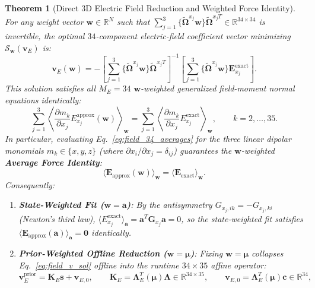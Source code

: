 \documentclass[11pt,a4paper]{article}
\newcommand{\bOmega}{\mathbf{\Omega}}
\newcommand{\bLambda}{\mathbf{\Lambda}}
\newtheorem{theorem}{Theorem}
\begin{document}
\begin{theorem}[Direct 3D Electric Field Reduction and Weighted Force Identity]
\label{thm:field_reduction}
For any weight vector $\bm{w} \in \mathbb{R}^N$ such that $\sum_{j=1}^3 \{\tilde{\bOmega}^{x_j} \bm{w}\} \tilde{\bOmega}^{x_j T} \in \mathbb{R}^{34 \times 34}$ is invertible, the optimal $34$-component electric-field coefficient vector minimizing $\mathcal{S}_{\bm{w}}(\bm{v}_E)$ is:
\begin{equation}
    \bm{v}_E(\bm{w}) = - \left[ \sum_{j=1}^3 \{\tilde{\bOmega}^{x_j} \bm{w}\} \tilde{\bOmega}^{x_j T} \right]^{-1} \left[ \sum_{j=1}^3 \{\tilde{\bOmega}^{x_j} \bm{w}\} \bm{E}_{x_j}^{\mathrm{exact}} \right].
    \label{eq:field_v_sol}
\end{equation}
This solution satisfies all $M_E = 34$ $\bm{w}$-weighted generalized field-moment normal equations identically:
\begin{equation}
    \sum_{j=1}^3 \left\langle \frac{\partial m_k}{\partial x_j} E_{x_j}^{\mathrm{approx}}(\bm{w}) \right\rangle_{\bm{w}} = \sum_{j=1}^3 \left\langle \frac{\partial m_k}{\partial x_j} E_{x_j}^{\mathrm{exact}} \right\rangle_{\bm{w}}, \qquad k = 2, \dots, 35.
    \label{eq:field_34_averages}
\end{equation}
In particular, evaluating Eq.~\eqref{eq:field_34_averages} for the three linear dipolar monomials $m_k \in \{x, y, z\}$ (where $\partial x_i / \partial x_j = \delta_{ij}$) guarantees the $\bm{w}$-weighted \textbf{Average Force Identity}:
\begin{equation}
    \langle \bm{E}_{\mathrm{approx}}(\bm{w}) \rangle_{\bm{w}} = \langle \bm{E}_{\mathrm{exact}} \rangle_{\bm{w}}.
    \label{eq:avg_force_preservation}
\end{equation}
Consequently:
\begin{enumerate}
    \item \textbf{State-Weighted Fit ($\bm{w} = \bm{a}$)}: By the antisymmetry $G_{x_j, ik} = -G_{x_j, ki}$ (Newton's third law), $\langle E_{x_j}^{\mathrm{exact}} \rangle_{\bm{a}} = \bm{a}^T \bm{G}_{x_j} \bm{a} = 0$, so the state-weighted fit satisfies $\langle \bm{E}_{\mathrm{approx}}(\bm{a}) \rangle_{\bm{a}} = \bm{0}$ identically.
    \item \textbf{Prior-Weighted Offline Reduction ($\bm{w} = \bm{\mu}$)}: Fixing $\bm{w} = \bm{\mu}$ collapses Eq.~\eqref{eq:field_v_sol} offline into the runtime $34 \times 35$ affine operator:
    \begin{equation}
        \bm{v}_E^{\mathrm{prior}} = \bm{K}_E \bm{s} + \bm{v}_{E,0}, \qquad \bm{K}_E = \bLambda_E^T(\bm{\mu}) \bLambda \in \mathbb{R}^{34 \times 35}, \qquad \bm{v}_{E,0} = \bLambda_E^T(\bm{\mu}) \bm{c} \in \mathbb{R}^{34},

\end{equation}
\end{enumerate}
\end{theorem}
\end{document}
